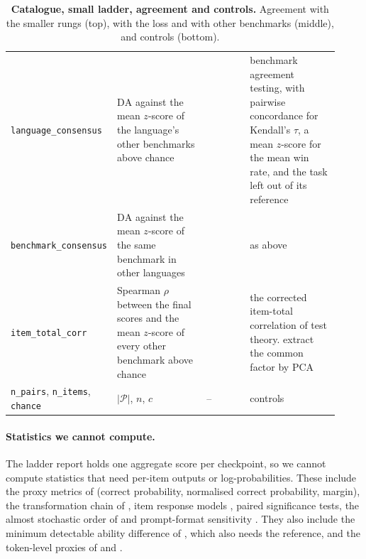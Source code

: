 \begin{table}[t]
\begin{tabular}{@{}p{0.215\linewidth}p{0.28\linewidth}p{0.14\linewidth}p{0.285\linewidth}@{}}
\texttt{language\_consensus} & $\mathrm{DA}$ against the mean $z$-score of the language's other benchmarks above chance & \citet{perlitz_benchbench_2024} & benchmark agreement testing, with pairwise concordance for Kendall's $\tau$, a mean $z$-score for the mean win rate, and the task left out of its reference \\
\texttt{benchmark\_consensus} & $\mathrm{DA}$ against the mean $z$-score of the same benchmark in other languages & \citet{perlitz_benchbench_2024} & as above \\
\texttt{item\_total\_corr} & Spearman $\rho$ between the final scores and the mean $z$-score of every other benchmark above chance & \citet{ruan_observational_2024, cronbach_coefficient_1951} & the corrected item-total correlation of test theory. \citet{ruan_observational_2024} extract the common factor by PCA \\
\midrule
\texttt{n\_pairs}, \texttt{n\_items}, \texttt{chance} & $|\mathcal{P}|$, $n$, $c$ & -- & controls \\
\bottomrule
\end{tabular}
\caption{\textbf{Catalogue, small ladder, agreement and controls.} Agreement with the smaller rungs (top), with the loss and with other benchmarks (middle), and controls (bottom).}
\label{tab:sur-agreement}
\end{table}

\paragraph{Statistics we cannot compute.}
The ladder report holds one aggregate score per checkpoint, so we cannot compute statistics that need per-item outputs or log-probabilities. These include the proxy metrics of \citet{magnusson_datadecide_2025} (correct probability, normalised correct probability, margin), the transformation chain of \citet{schaeffer_why_2024}, item response models \citep{polo_tinybenchmarks_2024, kipnis_metabench_2025}, paired significance tests, the almost stochastic order of \citet{dror_deep_2019} and prompt-format sensitivity \citep{alzahrani_when_2024}. They also include the minimum detectable ability difference of \citet{yauney_reliable_2026}, which also needs the reference, and the token-level proxies of \citet{patel_forecasting_2026} and \citet{koh_predicting_2026}.

